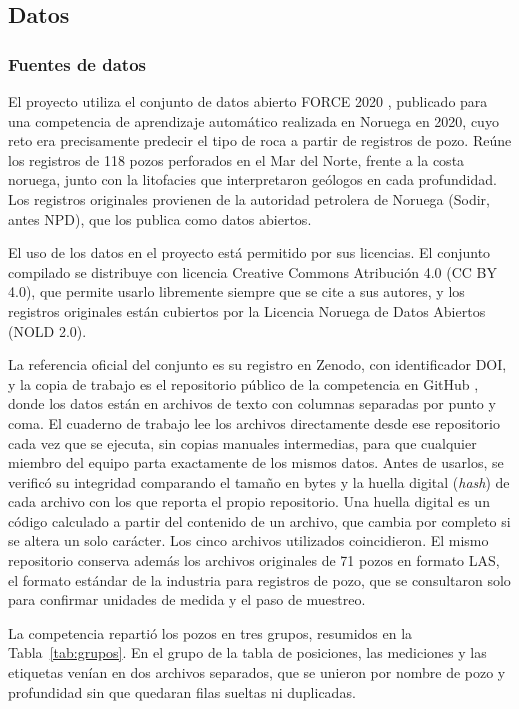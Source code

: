 \documentclass[11pt,a4paper]{article}
\begin{document}
\subsection{Datos}

\subsubsection{Fuentes de datos}

El proyecto utiliza el conjunto de datos abierto FORCE 2020 \cite{bormann2020}, publicado para una competencia de aprendizaje automático realizada en Noruega en 2020, cuyo reto era precisamente predecir el tipo de roca a partir de registros de pozo. Reúne los registros de 118 pozos perforados en el Mar del Norte, frente a la costa noruega, junto con la litofacies que interpretaron geólogos en cada profundidad. Los registros originales provienen de la autoridad petrolera de Noruega (Sodir, antes NPD), que los publica como datos abiertos.

El uso de los datos en el proyecto está permitido por sus licencias. El conjunto compilado se distribuye con licencia Creative Commons Atribución 4.0 (CC BY 4.0), que permite usarlo libremente siempre que se cite a sus autores, y los registros originales están cubiertos por la Licencia Noruega de Datos Abiertos (NOLD 2.0).

La referencia oficial del conjunto es su registro en Zenodo, con identificador DOI, y la copia de trabajo es el repositorio público de la competencia en GitHub \cite{force2020repo}, donde los datos están en archivos de texto con columnas separadas por punto y coma. El cuaderno de trabajo lee los archivos directamente desde ese repositorio cada vez que se ejecuta, sin copias manuales intermedias, para que cualquier miembro del equipo parta exactamente de los mismos datos. Antes de usarlos, se verificó su integridad comparando el tamaño en bytes y la huella digital (\emph{hash}) de cada archivo con los que reporta el propio repositorio. Una huella digital es un código calculado a partir del contenido de un archivo, que cambia por completo si se altera un solo carácter. Los cinco archivos utilizados coincidieron. El mismo repositorio conserva además los archivos originales de 71 pozos en formato LAS, el formato estándar de la industria para registros de pozo, que se consultaron solo para confirmar unidades de medida y el paso de muestreo.

La competencia repartió los pozos en tres grupos, resumidos en la Tabla~\ref{tab:grupos}. En el grupo de la tabla de posiciones, las mediciones y las etiquetas venían en dos archivos separados, que se unieron por nombre de pozo y profundidad sin que quedaran filas sueltas ni duplicadas.
\end{document}
